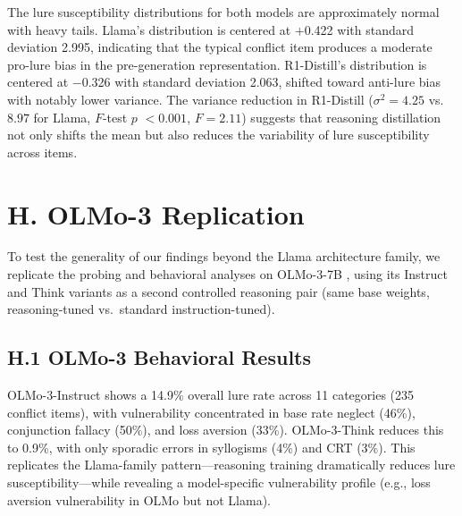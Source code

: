 \documentclass{article}
\begin{document}
The lure susceptibility distributions for both models are approximately
normal with heavy tails.  Llama's distribution is centered at $+$0.422
with standard deviation 2.995, indicating that the typical conflict
item produces a moderate pro-lure bias in the pre-generation
representation.  R1-Distill's distribution is centered at $-$0.326
with standard deviation 2.063, shifted toward anti-lure bias with
notably lower variance.  The variance reduction in R1-Distill
($\sigma^2 = 4.25$ vs.\ $8.97$ for Llama, $F$-test $p$
$< 0.001$, $F = 2.11$) suggests that reasoning distillation not only shifts
the mean but also reduces the variability of lure susceptibility
across items.


\section*{H. OLMo-3 Replication}
\label{sec:appendix_olmo}

To test the generality of our findings beyond the Llama architecture
family, we replicate the probing and behavioral analyses on OLMo-3-7B
\citep{groeneveld2024olmo}, using its Instruct and Think variants as a
second controlled reasoning pair (same base weights, reasoning-tuned
vs.\ standard instruction-tuned).

\subsection*{H.1 OLMo-3 Behavioral Results}

OLMo-3-Instruct shows a 14.9\% overall lure rate across 11 categories
(235 conflict items), with vulnerability concentrated in base rate neglect
(46\%), conjunction fallacy (50\%), and loss aversion (33\%).
OLMo-3-Think reduces this to 0.9\%, with only sporadic errors in
syllogisms (4\%) and CRT (3\%).  This replicates the Llama-family
pattern---reasoning training dramatically reduces lure susceptibility---while
revealing a model-specific vulnerability profile (e.g., loss aversion
vulnerability in OLMo but not Llama).
\end{document}
